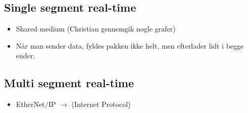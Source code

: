 \documentclass[oneside, 10pt]{article}
\begin{document}
\subsection{Single segment real-time}

\begin{itemize}
	\item Shared medium (Christian gennemgik nogle grafer)
	\item Når man sender data, fyldes pakken ikke helt, men efterlader lidt i begge ender.
\end{itemize}

\subsection{Multi segment real-time}
\begin{itemize}
	\item EtherNet/IP $\rightarrow$ (Internet Protocol)
\end{itemize}
\end{document}
